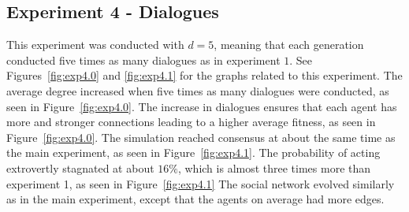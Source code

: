 \clearpage
\subsection{Experiment 4 - Dialogues}
This experiment was conducted with $d = 5$, meaning that each generation conducted five times as many dialogues as in experiment $1$. See Figures~\ref{fig:exp4.0} and \ref{fig:exp4.1} for the graphs related to this experiment. The average degree increased when five times as many dialogues were conducted, as seen in Figure~\ref{fig:exp4.0}. The increase in dialogues ensures that each agent has more and stronger connections leading to a higher average fitness, as seen in Figure~\ref{fig:exp4.0}. The simulation reached consensus at about the same time as the main experiment, as seen in Figure~\ref{fig:exp4.1}. The probability of acting extrovertly stagnated at about $16\%$, which is almost three times more than experiment 1, as seen in Figure~\ref{fig:exp4.1} The social network evolved similarly as in the main experiment, except that the agents on average had more edges.

